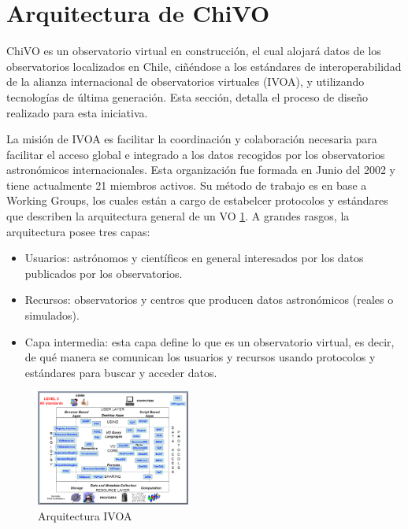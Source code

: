 \section{Arquitectura de ChiVO}

ChiVO es un observatorio virtual en construcción, el cual alojará datos de los
observatorios localizados en Chile, ciñéndose a los estándares de
interoperabilidad de la alianza internacional de observatorios virtuales (IVOA),
y utilizando tecnologías de última generación. Esta sección, detalla el
proceso de diseño realizado para esta iniciativa.

La misión de IVOA es facilitar la coordinación y colaboración necesaria para facilitar el acceso global e integrado a los datos recogidos por los observatorios astronómicos internacionales. Esta organización fue formada en Junio del 2002 y tiene actualmente 21 miembros activos. Su método de trabajo es en base a Working Groups, los cuales están a cargo de estabelcer protocolos y estándares que describen la arquitectura general de un VO \ref{fig:ivoavacio}. A grandes rasgos, la arquitectura posee tres capas:
\begin{itemize}
    \item Usuarios: astrónomos y científicos en general interesados por los datos publicados por los observatorios.
    \item Recursos: observatorios y centros que producen datos astronómicos (reales o simulados).
    \item Capa intermedia: esta capa define lo que es un observatorio virtual, es decir, de qué manera se comunican los usuarios y recursos usando protocolos y estándares para buscar y acceder datos.
\end{itemize}

\begin{figure}[ht]
    \centering
    \includegraphics[width=0.45\textwidth]{images/ivoavacio.png}
    \caption{Arquitectura IVOA}
    \label{fig:ivoavacio}
\end{figure}

